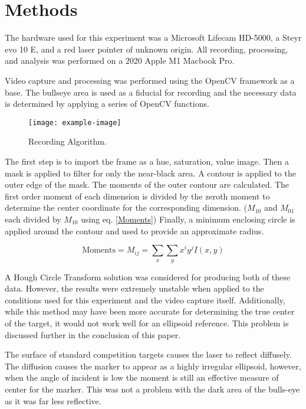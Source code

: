 \documentclass[conference]{IEEEtran}
\begin{document}
\section{Methods}

The hardware used for this experiment was 
a Microsoft Lifecam HD-5000,
a Steyr evo 10 E,
and a red laser pointer of unknown origin.
All recording, processing, and analysis was performed on 
a 2020 Apple M1 Macbook Pro.

Video capture and processing was performed using the 
OpenCV \cite{itseez2015opencv} framework as a base.
The bullseye area is used as a fiducial for recording and 
the necessary data is determined by applying a series of OpenCV functions.

\begin{figure}[h]
	\centering
	\texttt{[image: example-image]}
	\caption{Recording Algorithm.}
	\label{fig:capture_algorithm}
\end{figure}

The first step is to import the frame as a hue, saturation, value image.
Then a mask is applied to filter for only the near-black area.
A contour is applied to the outer edge of the mask.
The moments of the outer contour are calculated.
The first order moment of each dimension is divided by the zeroth moment to determine the center coordinate for the corresponding dimension.
($M_{10}$ and $M_{01}$ each divided by $M_{10}$ using eq. \eqref{Moments})
Finally, a minimum enclosing circle is applied around the contour and used to provide an approximate radius.

\begin{equation}\label{Moments}
	\text{Moments} = M_{ij} = \sum_{x} \sum_{y} x^i y^j I(x,y)
\end{equation}

A Hough Circle Transform solution \cite{Hough1964} was considered for producing both of these data.
However, the results were extremely unstable when applied to the conditions used for this experiment and the video capture itself.
Additionally, while this method may have been more accurate for determining the true center of the target, it would not work well for an ellipsoid reference.
This problem is discussed further in the conclusion of this paper.

The surface of standard competition targets causes the laser to reflect diffusely.
The diffusion causes the marker to appear as a highly irregular ellipsoid,
however, when the angle of incident is low the moment is still an effective measure of center for the marker.
This was not a problem with the dark area of the bulls-eye as it was far less reflective.
\end{document}
